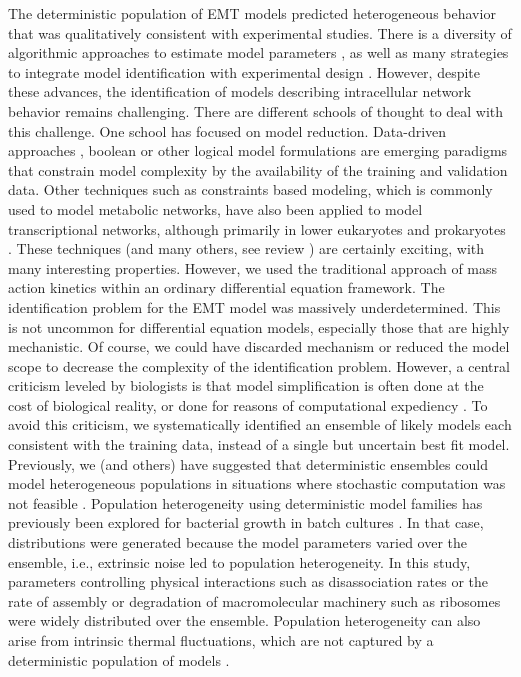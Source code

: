\documentclass[12pt]{article}
\begin{document}
The deterministic population of EMT models predicted heterogeneous behavior that was qualitatively consistent with experimental studies.
There is a diversity of algorithmic approaches to estimate model parameters \citep{Moles:2003aa}, as well as many strategies to integrate model identification with experimental design \citep{Rodriguez-Fernandez:2013aa,Villaverde:2014aa}.
However, despite these advances, the identification of models describing intracellular network behavior remains challenging.
There are different schools of thought to deal with this challenge.
One school has focused on model reduction.
Data-driven approaches \citep{Cirit:2012kx}, boolean \citep{Choi:2012bs} or other logical model formulations \citep{Morris:2011ys,Terfve:2012kq}
are emerging paradigms that constrain model complexity by the availability of the training and validation data.
Other techniques such as constraints based modeling, which is commonly used to model metabolic networks, have also been applied to model transcriptional networks, although primarily in lower eukaryotes and prokaryotes \citep{Hyduke:2010rt}. These techniques (and many others, see review \citep{Wayman2013}) are certainly exciting, with many interesting properties.
However, we used the traditional approach of mass action kinetics within an ordinary differential equation framework.
The identification problem for the EMT model was massively underdetermined.
This is not uncommon for differential equation models, especially those that are highly mechanistic.
Of course, we could have discarded mechanism or reduced the model scope to decrease the complexity of the identification problem.
However, a central criticism leveled by biologists is that model simplification is often done at the cost of biological reality, or done for reasons of computational expediency \citep{Sainani2012}.
To avoid this criticism, we systematically identified an ensemble of likely models each consistent with the training data, instead of a single but uncertain best fit model.
Previously, we (and others) have suggested that deterministic ensembles could model heterogeneous populations in situations where stochastic computation was not feasible \citep{Lequieu:2011fj}.
Population heterogeneity using deterministic model families has previously been explored for bacterial growth in batch cultures \citep{Lee:2009fk}.
In that case, distributions were generated because the model parameters varied over the ensemble, i.e., extrinsic noise led to population heterogeneity.
In this study, parameters controlling physical interactions such as disassociation rates or the rate of assembly or degradation of macromolecular machinery such as ribosomes were widely distributed over the ensemble. Population heterogeneity can also arise from intrinsic thermal fluctuations, which are not captured by a deterministic population of models \citep{Swain:2002ve}.
\end{document}
